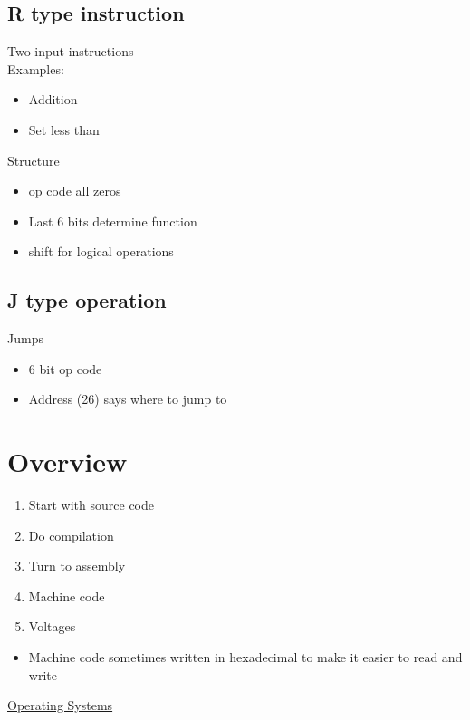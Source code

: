 \documentclass{article}[18pt]
\begin{document}
\subsection{R type instruction}
Two input instructions\\
Examples:
\begin{itemize}
\item Addition
\item Set less than
\end{itemize}
Structure
\begin{itemize}
\item op code all zeros
\item Last 6 bits determine function
\item shift for logical operations
\end{itemize}
\subsection{J type operation}
Jumps
\begin{itemize}
\item 6 bit op code
\item Address (26) says where to jump to
\end{itemize}
\section{Overview}
\begin{enumerate}

\item Start with source code
\item Do compilation
\item Turn to assembly
\item Machine code
\item Voltages

\end{enumerate}
\begin{itemize}
\item Machine code sometimes written in hexadecimal to make it easier to read and write
\end{itemize}
\newpage
\begin{center}
	\underline{\huge Operating Systems}
\end{center}
\end{document}
